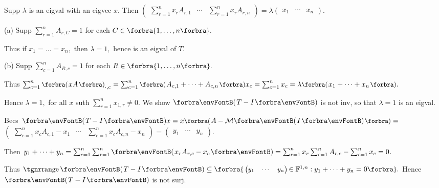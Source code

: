 \par\quad
Supp $\lambda$ is an eigval with an eigvec $x.$ Then {\normalsize$\begin{pmatrix} \sum_{r=1}^n x_r A_{r,1} &\cdots & \sum_{r=1}^n x_r A_{r,n}\end{pmatrix}$}${}=\lambda${\normalsize$\begin{pmatrix} x_1 & \cdots & x_n\end{pmatrix}$}.\vspace{4pt}\par\quad
(a) Supp $\sum_{r=1}^n A_{r,C}=1$ for each $C\in\Bra{1,\dots,n}.$\par\quad\Ha
Thus if $x_1=\dots=x_n,$ then $\lambda=1,$ hence is an eigval of $T.$\vspace{4pt}\par\quad
(b) Supp $\sum_{c=1}^n A_{R,c}=1$ for each $R\in\Bra{1,\dots,n}.$\vspace{2pt}\par\quad\Hb
Thus $\sum_{c=1}^n \BigPar{xA}_{\cdot,c}=\sum_{c=1}^n\BigPar{A_{c,1}+\dots+A_{c,n}}x_c=\sum_{c=1}^n x_c=\lambda\BigPar{x_1+\dots+x_n}.$\vspace{2pt}\par\quad\Hb
Hence $\lambda=1,$ for all $x$ suth $\sum_{r=1}^n x_{1,r}\neq 0.$\PfEnd\vspace{6pt}\quad\Hb
\Or We show $\Par{T-I}$ is not inv, so that $\lambda=1$ is an eigval.\par\quad\Hb
Becs $\Par{T-I}x=x\BigPar{A-\Mt{I}}={}${\normalsize$\begin{pmatrix} \sum_{c=1}^n x_c A_{c,1}-x_1 &\cdots & \sum_{c=1}^n x_c A_{c,n}-x_n\end{pmatrix}$}${}={}${\normalsize$\begin{pmatrix} y_1 & \cdots & y_n\end{pmatrix}$}.\vspace{2pt}\par\quad\Hb
Then $y_1+\dots+y_n=\sum_{c=1}^n\sum_{r=1}^n\Par{x_r A_{r,c}-x_c}=\sum_{r=1}^n x_r\sum_{c=1}^n A_{r,c}-\sum_{c=1}^n x_c=0.$\par\vspace{4pt}\quad\Hb
Thus $\range\Par{T-I}\subseteq\Bra{\,${\small$\begin{pmatrix}y_1 & \cdots & y_n\end{pmatrix}$}$\,\in\Fbb^{1,n}:y_1+\dots+y_n=0}.$ Hence $\Par{T-I}$ is not surj.\PfEnd\vspace{6pt}\quad\Hb
